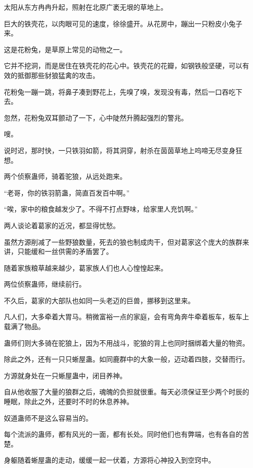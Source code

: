 
\begin{this_body}

太阳从东方冉冉升起，照射在北原广袤无垠的草地上。

巨大的铁壳花，以肉眼可见的速度，徐徐盛开。从花房中，蹦出一只粉皮小兔子来。

这是花粉兔，是草原上常见的动物之一。

它并不挖洞，而是居住在铁壳花的花心中。铁壳花的花瓣，如钢铁般坚硬，可以有效的抵御那些豺狼猛禽的攻击。

花粉兔一蹦一跳，将鼻子凑到野花上，先嗅了嗅，发现没有毒，然后一口吞吃下去。

忽然，花粉兔双耳颤动了一下，心中陡然升腾起强烈的警兆。

嗖。

说时迟，那时快，一只铁羽如箭，将其洞穿，射杀在茵茵草地上呜啼无尽变身狂想。

两个侦察蛊师，骑着驼狼，从远处跑来。

“老哥，你的铁羽箭蛊，简直百发百中啊。”

“唉，家中的粮食越发少了。不得不打点野味，给家里人充饥啊。”

两人谈论着葛家的近况，都显得忧愁。

虽然方源削减了一些野狼数量，死去的狼也制成肉干，但对葛家这个庞大的族群来讲，只能缓和一丝供需的矛盾罢了。

随着家族粮草越来越少，葛家族人们也人心惶惶起来。

两位侦察蛊师，继续前行。

不久后，葛家的大部队也如同一头老迈的巨兽，挪移到这里来。

凡人们，大多牵着大胃马。稍微富裕一点的家庭，会有弯角奔牛牵着板车，板车上载满了物品。

蛊师们则大多骑在驼狼上，因为不用战斗，驼狼的背上也同时捆绑着大量的物资。

除此之外，还有一只只蜥屋蛊。如同鹿群中的大象一般，迈动着四肢，交替而行。

方源就身处在一只蜥屋蛊中，闭目养神。

自从他收服了大量的狼群之后，魂魄的负担就很重。每天必须保证至少两个时辰的睡眠，除此之外，还要时不时的休息养神。

奴道蛊师不是这么容易当的。

每个流派的蛊师，都有风光的一面，都有长处。同时他们也有弊端，也有各自的苦楚。

身躯随着蜥屋蛊的走动，缓缓一起一伏着，方源将心神投入到空窍中。


\end{this_body}
